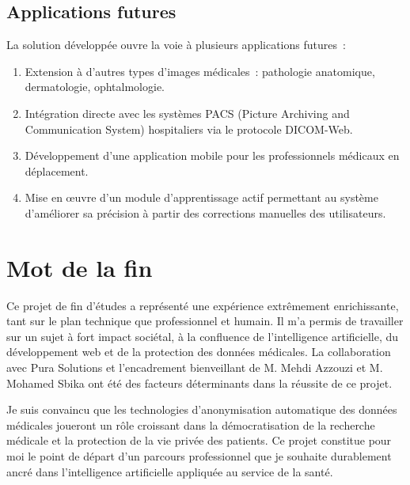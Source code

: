 \subsection*{Applications futures}

La solution développée ouvre la voie à plusieurs applications futures~:
\begin{enumerate}
  \item Extension à d'autres types d'images médicales~: pathologie anatomique, dermatologie, ophtalmologie.
  \item Intégration directe avec les systèmes PACS (Picture Archiving and Communication System) hospitaliers via le protocole DICOM-Web.
  \item Développement d'une application mobile pour les professionnels médicaux en déplacement.
  \item Mise en œuvre d'un module d'apprentissage actif permettant au système d'améliorer sa précision à partir des corrections manuelles des utilisateurs.
\end{enumerate}

\section*{Mot de la fin}

Ce projet de fin d'études a représenté une expérience extrêmement enrichissante, tant sur le plan technique que professionnel et humain. Il m'a permis de travailler sur un sujet à fort impact sociétal, à la confluence de l'intelligence artificielle, du développement web et de la protection des données médicales. La collaboration avec Pura Solutions et l'encadrement bienveillant de M. Mehdi Azzouzi et M. Mohamed Sbika ont été des facteurs déterminants dans la réussite de ce projet.

Je suis convaincu que les technologies d'anonymisation automatique des données médicales joueront un rôle croissant dans la démocratisation de la recherche médicale et la protection de la vie privée des patients. Ce projet constitue pour moi le point de départ d'un parcours professionnel que je souhaite durablement ancré dans l'intelligence artificielle appliquée au service de la santé.
